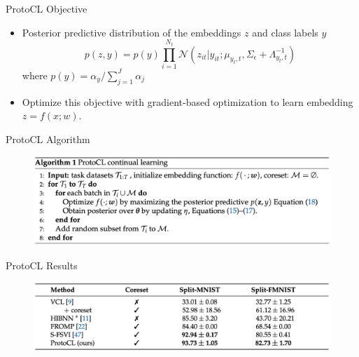 \documentclass[12pt,aspectratio=169, handout]{beamer}
\let\olditem\item
\renewcommand\item{\olditem\justifying}
\begin{document}
\begin{frame}{ProtoCL Objective}
    \begin{itemize}[<+->]
        \item Posterior predictive distribution of the embeddings $z$ and class labels $y$
    $$p(z,y) = p(y)\prod_{i=1}^{N_t} \mathcal{N}(z_{it} | y_{it}; \mu_{y_t, t}, \Sigma_\epsilon + \Lambda_{y_t, t}^{-1})$$
    where $p(y) = \alpha_y / \sum_{j=1}^J \alpha_j$

        \item Optimize this objective with gradient-based optimization to learn embedding $z=f(x;w)$.
    \end{itemize}
\end{frame}

    


\begin{frame}{ProtoCL Algorithm}
    \begin{figure}
		\centering
		\includegraphics[width=\textwidth]{"images/Algo1.png"}
	\end{figure}
\end{frame}




\begin{frame}{ProtoCL Results}
    \begin{figure}
		\centering
		\includegraphics[width=\textwidth]{"images/Table1_pic.png"}
	\end{figure}
\end{frame}
\end{document}
